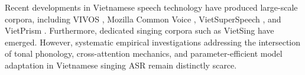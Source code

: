 Recent developments in Vietnamese speech technology have produced large-scale corpora, including VIVOS \cite{luong2016vivos}, Mozilla Common Voice \cite{ardila2020common}, VietSuperSpeech \cite{thanh2026vietsuperspeech}, and VietPrism \cite{hoang2026vietprism}. Furthermore, dedicated singing corpora such as VietSing \cite{vu2024vietsing} have emerged. However, systematic empirical investigations addressing the intersection of tonal phonology, cross-attention mechanics, and parameter-efficient model adaptation in Vietnamese singing ASR remain distinctly scarce.
